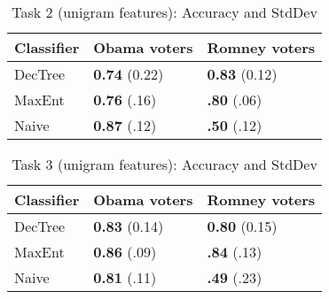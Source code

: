 \begin{table}[H]
\begin{centering}
\begin{tabular}{ l | l | l }
Classifier & Obama voters & Romney voters \\
\hline
DecTree & \textbf{0.74} (0.22) &  \textbf{0.83} (0.12) \\
MaxEnt & \textbf{0.76} (.16) &  \textbf{.80} (.06) \\
Naive & \textbf{0.87} (.12) &  \textbf{.50} (.12) \\
\end{tabular}
\caption{Task 2 (unigram features): Accuracy and StdDev}
\label{tab:task2unigrams}
\end{centering}
\end{table}

\begin{table}[H]
\begin{centering}
\begin{tabular}{ l | l | l }
Classifier & Obama voters & Romney voters \\
\hline
DecTree & \textbf{0.83} (0.14) &  \textbf{0.80} (0.15) \\
MaxEnt & \textbf{0.86} (.09) &  \textbf{.84} (.13) \\
Naive & \textbf{0.81} (.11) &  \textbf{.49} (.23) \\
\end{tabular}
\caption{Task 3 (unigram features): Accuracy and StdDev}
\label{tab:task3unigrams}
\end{centering}
\end{table}
